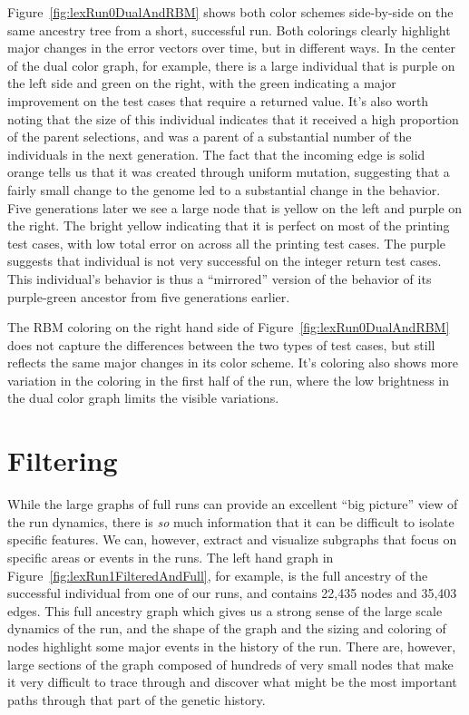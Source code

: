\documentclass{sig-alternate}
\begin{document}
Figure~\ref{fig:lexRun0DualAndRBM} shows both color schemes side-by-side on the same
ancestry tree from a short, successful run. Both colorings clearly highlight major
changes in the error vectors over time, but in different ways. In the center of the 
dual color graph, for example, there is a large individual that is purple on the left
side and green on the right, with the green indicating a major improvement on the
test cases that require a returned value. It's also worth noting that the size of
this individual indicates that it received a high proportion of the parent selections,
and was a parent of a substantial number of the individuals in the next generation.
The fact that the incoming edge is solid orange tells us that it was created through
uniform mutation, suggesting that a fairly small change to the genome led to a
substantial change in the behavior. Five generations later we see a large node that
is yellow on the left and purple on the right. The bright yellow indicating that 
it is perfect on most of the printing test cases, with low total error on across all
the printing test cases. The purple suggests that individual is not very successful
on the integer return test cases. This individual's behavior is thus a ``mirrored'' 
version of the behavior of its purple-green ancestor from five generations earlier.

The RBM coloring on the right hand side of Figure~\ref{fig:lexRun0DualAndRBM} does not
capture the differences between the two types of test cases, but still reflects the
same major changes in its color scheme. It's coloring also shows more variation in the
coloring in the first half of the run, where the low brightness in the dual color
graph limits the visible variations.


\section{Filtering}
\label{sec:filtering}

While the large graphs of full runs can provide an excellent ``big picture'' 
view of the run dynamics, there is \emph{so} much information that it can be
difficult to isolate specific features. We can, however, extract and visualize
subgraphs that focus on specific areas or events in the runs. The left hand 
graph in Figure~\ref{fig:lexRun1FilteredAndFull}, for example, is the full 
ancestry of the
successful individual from one of our runs, and contains 22,435 nodes
and 35,403 edges. This full ancestry graph which gives us a strong sense of the 
large scale dynamics of the run, and the shape of the graph and the sizing and 
coloring of nodes highlight some major events in the history of the run. There 
are, however, large sections of the graph composed of hundreds of very small 
nodes that make it very difficult to trace through and discover what might be 
the most important paths through that part of the genetic history.
\end{document}
